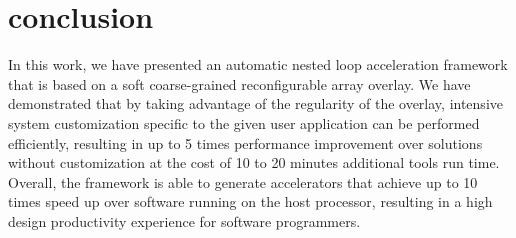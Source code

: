 \section{conclusion} \label{sec:conclusion}


In this work, we have presented an automatic nested loop acceleration framework that is based on a soft coarse-grained reconfigurable array overlay.
We have demonstrated that by taking advantage of the regularity of the overlay, intensive system customization specific to the given user application can be performed efficiently, resulting in up to \num{5} times performance improvement over solutions without customization at the cost of \num{10} to \num{20} minutes additional tools run time.  Overall, the framework is able to generate accelerators that achieve up to \num{10} times speed up over software running on the host processor, resulting in a high design productivity experience for software programmers.


